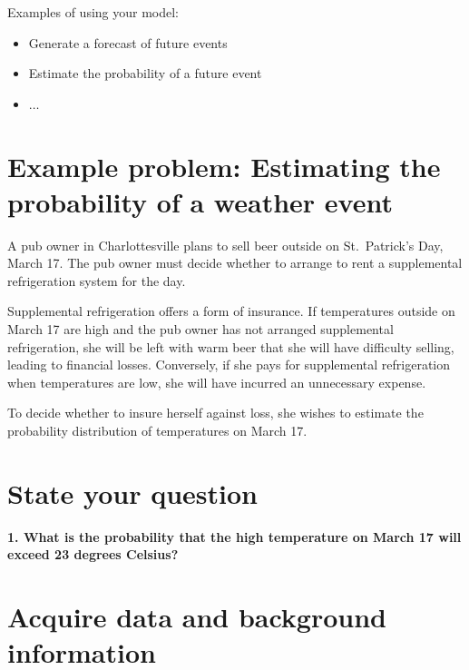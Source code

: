\documentclass[
]{book}
\providecommand{\tightlist}{%
  \setlength{\itemsep}{0pt}\setlength{\parskip}{0pt}}
\begin{document}
Examples of using your model:

\begin{itemize}
\tightlist
\item
  Generate a forecast of future events
\item
  Estimate the probability of a future event
\item
  \(\ldots\)
\end{itemize}

\hypertarget{example-problem-estimating-the-probability-of-a-weather-event}{%
\section*{Example problem: Estimating the probability of a weather event}\label{example-problem-estimating-the-probability-of-a-weather-event}}

A pub owner in Charlottesville plans to sell beer outside on St.~Patrick's Day, March 17. The pub owner must decide whether to arrange to rent a supplemental refrigeration system for the day.

Supplemental refrigeration offers a form of insurance. If temperatures outside on March 17 are high and the pub owner has not arranged supplemental refrigeration, she will be left with warm beer that she will have difficulty selling, leading to financial losses. Conversely, if she pays for supplemental refrigeration when temperatures are low, she will have incurred an unnecessary expense.

To decide whether to insure herself against loss, she wishes to estimate the probability distribution of temperatures on March 17.

\hypertarget{state-your-question}{%
\section{State your question}\label{state-your-question}}

\textbf{1. What is the probability that the high temperature on March 17 will exceed 23 degrees Celsius?}

\hypertarget{acquire-data-and-background-information}{%
\section{Acquire data and background information}\label{acquire-data-and-background-information}}
\end{document}
